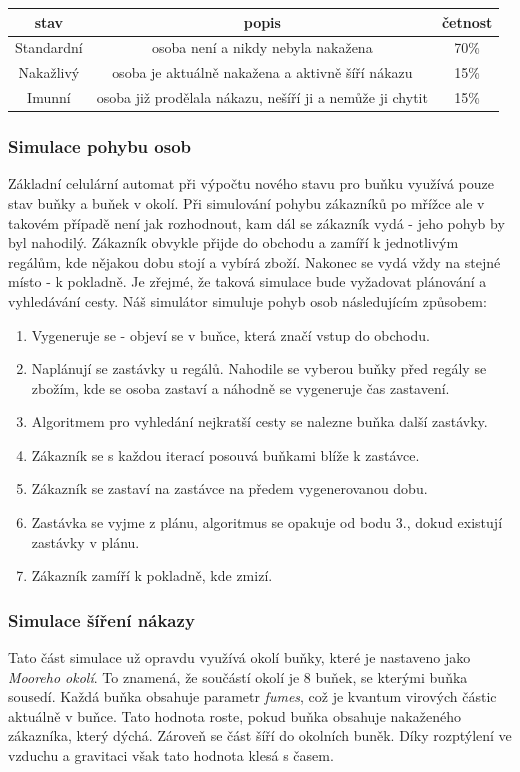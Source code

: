 \documentclass[11pt,a4paper]{article}
\begin{document}
\begin{center}
    \begin{tabular}{ |c|c|c| } 
    \hline
        stav & popis & četnost  \\  \hline
        Standardní & osoba není a nikdy nebyla nakažena & 70\%   \\ 
        Nakažlivý & osoba je aktuálně nakažena a aktivně šíří nákazu & 15\% \\
        Imunní & osoba již prodělala nákazu, nešíří ji a nemůže ji chytit & 15\% \\
    \hline
    \end{tabular}
\end{center}

\subsubsection{Simulace pohybu osob}
Základní celulární automat při výpočtu nového stavu pro buňku využívá pouze stav buňky a buňek v okolí. Při simulování pohybu zákazníků po mřížce ale v takovém případě není jak rozhodnout, kam
dál se zákazník vydá - jeho pohyb by byl nahodilý. Zákazník obvykle přijde do obchodu a zamíří k jednotlivým regálům, kde nějakou dobu stojí a vybírá zboží. Nakonec se vydá vždy na stejné místo - k pokladně. Je zřejmé, že taková simulace bude vyžadovat plánování a vyhledávání cesty. Náš simulátor simuluje pohyb osob následujícím způsobem:
\begin{enumerate}
    \item Vygeneruje se - objeví se v buňce, která značí vstup do obchodu.
    \item Naplánují se zastávky u regálů. Nahodile se vyberou buňky před regály se zbožím, kde se osoba zastaví a náhodně se vygeneruje čas zastavení.
    \item Algoritmem pro vyhledání nejkratší cesty se nalezne buňka další zastávky.
    \item Zákazník se s každou iterací posouvá buňkami blíže k zastávce.
    \item Zákazník se zastaví na zastávce na předem vygenerovanou dobu.
    \item Zastávka se vyjme z plánu, algoritmus se opakuje od bodu 3., dokud existují zastávky v plánu.
    \item Zákazník zamíří k pokladně, kde zmizí.
\end{enumerate}

\subsubsection{Simulace šíření nákazy}
Tato část simulace už opravdu využívá okolí buňky, které je nastaveno jako \emph{Mooreho okolí}. To znamená, že součástí okolí je 8 buňek, se kterými buňka sousedí. \cite{pepe-slides}
Každá buňka obsahuje parametr \emph{fumes}, což je kvantum virových částic aktuálně v buňce. Tato hodnota roste, pokud buňka obsahuje nakaženého zákazníka, který dýchá. Zároveň se část šíří do okolních buněk. Díky rozptýlení ve vzduchu a gravitaci však tato hodnota klesá s časem.
\end{document}
